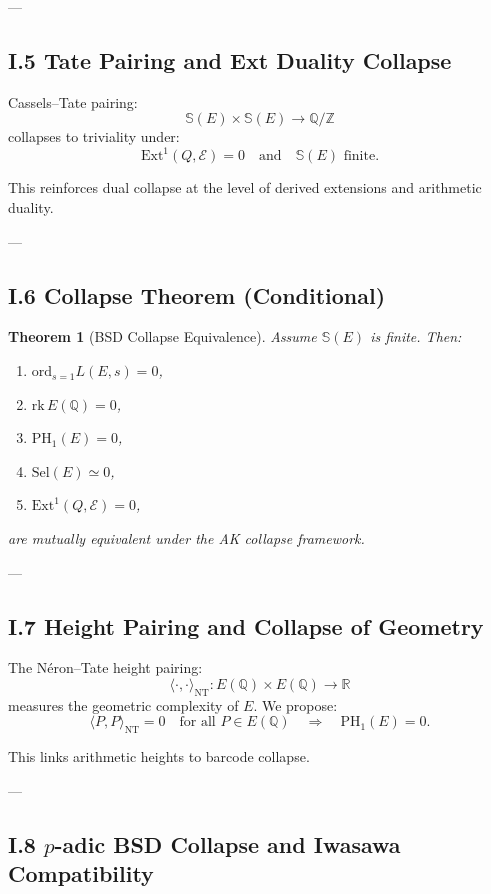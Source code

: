 \documentclass[11pt]{article}
\newcommand{\Sha}{\mathbb{S}}
\newtheorem{theorem}{Theorem}[section]
\begin{document}
---

\subsection*{I.5 Tate Pairing and Ext Duality Collapse}

Cassels–Tate pairing:
\[
\Sha(E) \times \Sha(E) \to \mathbb{Q}/\mathbb{Z}
\]
collapses to triviality under:
\[
\mathrm{Ext}^1(Q, \mathcal{E}) = 0 \quad \text{and} \quad \Sha(E) \text{ finite}.
\]

This reinforces dual collapse at the level of derived extensions and arithmetic duality.

---

\subsection*{I.6 Collapse Theorem (Conditional)}

\begin{theorem}[BSD Collapse Equivalence]
Assume $\Sha(E)$ is finite. Then:
\begin{enumerate}
  \item $\mathrm{ord}_{s=1} L(E,s) = 0$,
  \item $\mathrm{rk}\,E(\mathbb{Q}) = 0$,
  \item $\mathrm{PH}_1(E) = 0$,
  \item $\mathrm{Sel}(E) \simeq 0$,
  \item $\mathrm{Ext}^1(Q, \mathcal{E}) = 0$,
\end{enumerate}
are mutually equivalent under the AK collapse framework.
\end{theorem}

---

\subsection*{I.7 Height Pairing and Collapse of Geometry}

The Néron–Tate height pairing:
\[
\langle\cdot,\cdot\rangle_{\text{NT}} : E(\mathbb{Q}) \times E(\mathbb{Q}) \to \mathbb{R}
\]
measures the geometric complexity of $E$.  
We propose:
\[
\langle P,P \rangle_{\text{NT}} = 0 \quad \text{for all } P \in E(\mathbb{Q}) \quad \Rightarrow \quad \text{PH}_1(E) = 0.
\]

This links arithmetic heights to barcode collapse.

---

\subsection*{I.8 $p$-adic BSD Collapse and Iwasawa Compatibility}
\end{document}
